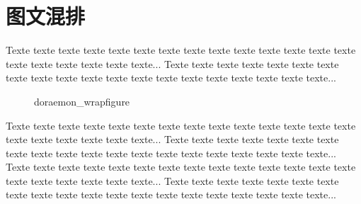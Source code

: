 \documentclass{article}
\begin{document}

\section{图文混排}
    Texte texte texte texte texte texte texte
    texte texte texte texte texte texte texte
    texte texte texte texte texte texte...
    Texte texte texte texte texte texte texte
    texte texte texte texte texte texte texte
    texte texte texte texte texte texte...

    \begin{figure}%
        \centering
        \caption{doraemon\_wrapfigure}
    \end{figure}
    Texte texte texte texte texte texte texte
    texte texte texte texte texte texte texte
    texte texte texte texte texte texte...
    Texte texte texte texte texte texte texte
    texte texte texte texte texte texte texte
    texte texte texte texte texte texte...
    Texte texte texte texte texte texte texte
    texte texte texte texte texte texte texte
    texte texte texte texte texte texte...
    Texte texte texte texte texte texte texte
    texte texte texte texte texte texte texte
    texte texte texte texte texte texte...

\listoffigures
\end{document}
